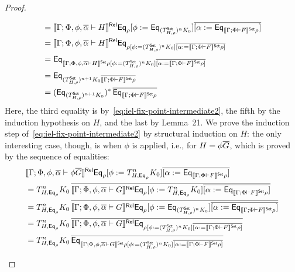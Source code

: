 \documentclass[acmsmall,review,anonymous]{acmart}
\theoremstyle{definition}
\newcommand{\set}{\mathsf{Set}}
\begin{document}
\begin{proof}
\begin{itemize}
\[\begin{split}
&= \relsem{\Gamma; \Phi, \phi, \ol{\alpha} \vdash H} \Eq_{\rho} [\phi
  := \Eq_{(T^\set_{H,\rho})^n K_0}] \overline{[\alpha :=
    \Eq_{\setsem{\Gamma; \Phi \vdash F}\rho}]} \\ 
&= \relsem{\Gamma; \Phi, \phi, \ol{\alpha} \vdash H} \Eq_{\rho [\phi
    := (T^\set_{H,\rho})^n K_0] \overline{[\alpha :=
      \setsem{\Gamma; \Phi \vdash F}\rho]}} \\ 
&= \Eq_{\setsem{\Gamma; \Phi, \phi, \ol{\alpha} \vdash H} \rho [\phi
    := (T^\set_{H,\rho})^n K_0] \overline{[\alpha :=
      \setsem{\Gamma; \Phi \vdash F}\rho]}} \\ 
&= \Eq_{(T^\set_{H,\rho})^{n+1} K_0 \overline{\setsem{\Gamma; \Phi
      \vdash F}\rho}} \\ 
&= (\Eq_{(T^\set_{H,\rho})^{n+1} K_0})^*\, \overline{\Eq_{\setsem{\Gamma;
      \Phi \vdash F}\rho}} 
\end{split}
\]
Here, the third equality is by~\eqref{eq:iel-fix-point-intermediate2},
the fifth by the induction hypothesis on $H$, and the last by
Lemma~21.  We prove the induction step
of~\eqref{eq:iel-fix-point-intermediate2} by structural induction on
$H$: the only interesting case, though, is when $\phi$ is applied,
i.e., for $H = \phi \overline{G}$, which is proved by the sequence of
equalities:
\[
\begin{split}
& \relsem{\Gamma; \Phi, \phi, \ol{\alpha} \vdash \phi
    \ol{G}} \Eq_{\rho} [\phi := T^{n}_{H,\Eq_{\rho}} K_0]
  \overline{[\alpha := \Eq_{\setsem{\Gamma; \Phi \vdash F}\rho}]}
  \\
&= T^{n}_{H,\Eq_{\rho}} K_0\, \overline{\relsem{\Gamma; \Phi,
      \phi, \ol{\alpha} \vdash G} \Eq_{\rho} [\phi :=
      T^{n}_{H,\Eq_{\rho}} K_0] \overline{[\alpha :=
        \Eq_{\setsem{\Gamma; \Phi \vdash F} \rho}]}} \\ 
&= T^{n}_{H,\Eq_{\rho}} K_0\, \overline{\relsem{\Gamma; \Phi,
      \phi, \ol{\alpha} \vdash G} \Eq_{\rho} [\phi :=
      \Eq_{(T^\set_{H,\rho})^{n} K_0}] \overline{[\alpha :=
        \Eq_{\setsem{\Gamma; \Phi \vdash F} \rho}]}} \\ 
&= T^{n}_{H,\Eq_{\rho}} K_0\, \overline{\relsem{\Gamma; \Phi,
      \phi, \ol{\alpha} \vdash G} \Eq_{\rho [\phi := (T^\set_{H,\rho})^{n}
        K_0] \overline{[\alpha := \setsem{\Gamma; \Phi \vdash
            F} \rho]}}} \\ 
&= T^{n}_{H,\Eq_{\rho}} K_0\, \overline{\Eq_{\setsem{\Gamma;
        \Phi, \phi, \ol{\alpha} \vdash G} \rho [\phi :=
        (T^\set_{H,\rho})^{n} K_0] \overline{[\alpha :=
          \setsem{\Gamma; \Phi \vdash F} \rho]}}} \\ 

\end{split}\]
\end{itemize}
\end{proof}
\end{document}
